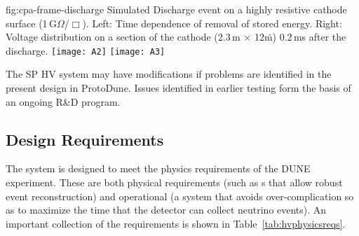 \begin{dunefigure}
{fig:cpa-frame-discharge}
{Simulated  Discharge event on a highly resistive cathode surface (1\,G$\Omega$/$\Box$). Left: Time dependence of removal of stored energy. Right: Voltage distribution on a section of the cathode (2.3\,m $\times$ 12\.m) 0.2\,ms after the discharge.}
\texttt{[image: A2]}
\texttt{[image: A3]}
\end{dunefigure}

The SP HV system may have modifications if problems are identified in the present design in ProtoDune. Issues identified in earlier testing form the basis of an ongoing R\&D program.



\subsection{Design Requirements}
\label{sec:fdsp-hv-des-consid}
 
The %
 system is designed to meet the physics requirements of the DUNE experiment. These are both physical requirements (such as \efield{}s that allow robust event reconstruction) and operational (a system that avoids over-complication so as to maximize the time that the detector can collect neutrino events). An important collection of the requirements is shown in 
Table~\ref{tab:hvphysicsreqs}.


